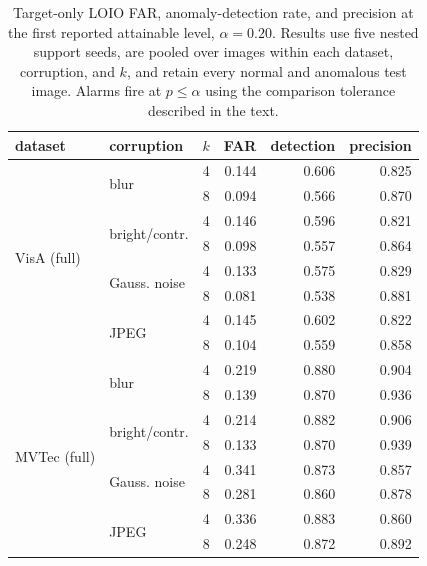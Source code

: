 \begin{table}[pos=t]
\centering
\caption{Target-only LOIO FAR, anomaly-detection rate, and precision at the first reported attainable level, $\alpha{=}0.20$. Results use five nested support seeds, are pooled over images within each dataset, corruption, and $k$, and retain every normal and anomalous test image. Alarms fire at $p\le\alpha$ using the comparison tolerance described in the text.}
\label{tab:false-alarm-control}
\footnotesize
\setlength{\tabcolsep}{3pt}
\begin{tabular}{llrrrr}
\toprule
dataset & corruption & $k$ & FAR & detection & precision \\
\midrule
\multirow{8}{*}{VisA (full)} & \multirow{2}{*}{blur} & 4 & 0.144 & 0.606 & 0.825 \\
 & & 8 & 0.094 & 0.566 & 0.870 \\
\cmidrule(lr){2-6}
 & \multirow{2}{*}{bright/contr.} & 4 & 0.146 & 0.596 & 0.821 \\
 & & 8 & 0.098 & 0.557 & 0.864 \\
\cmidrule(lr){2-6}
 & \multirow{2}{*}{Gauss. noise} & 4 & 0.133 & 0.575 & 0.829 \\
 & & 8 & 0.081 & 0.538 & 0.881 \\
\cmidrule(lr){2-6}
 & \multirow{2}{*}{JPEG} & 4 & 0.145 & 0.602 & 0.822 \\
 & & 8 & 0.104 & 0.559 & 0.858 \\
\midrule
\multirow{8}{*}{MVTec (full)} & \multirow{2}{*}{blur} & 4 & 0.219 & 0.880 & 0.904 \\
 & & 8 & 0.139 & 0.870 & 0.936 \\
\cmidrule(lr){2-6}
 & \multirow{2}{*}{bright/contr.} & 4 & 0.214 & 0.882 & 0.906 \\
 & & 8 & 0.133 & 0.870 & 0.939 \\
\cmidrule(lr){2-6}
 & \multirow{2}{*}{Gauss. noise} & 4 & 0.341 & 0.873 & 0.857 \\
 & & 8 & 0.281 & 0.860 & 0.878 \\
\cmidrule(lr){2-6}
 & \multirow{2}{*}{JPEG} & 4 & 0.336 & 0.883 & 0.860 \\
 & & 8 & 0.248 & 0.872 & 0.892 \\
\bottomrule
\end{tabular}
\end{table}
